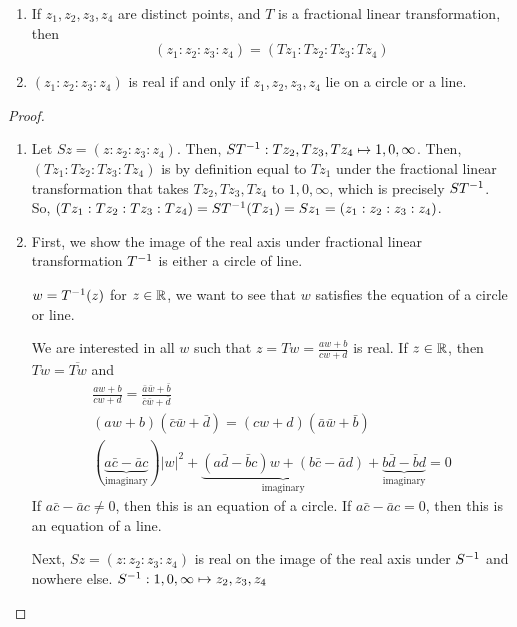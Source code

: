 \documentclass[a4paper,12pt]{article}
\begin{document}
\begin{theorem}
    \begin{enumerate}
        \item If $z_1,z_2,z_3,z_4$ are distinct points, and $T$ is a fractional linear transformation, then\begin{equation}
            (z_1:z_2:z_3:z_4)=(Tz_1:Tz_2:Tz_3:Tz_4)
        \end{equation}
        \item $(z_1:z_2:z_3:z_4)$ is real if and only if $z_1,z_2,z_3,z_4$ lie on a circle or a line.
    \end{enumerate}
    \begin{proof}
        \begin{enumerate}
            \item Let $Sz=(z:z_2:z_3:z_4)$. Then, $ST^{-1}:Tz_2,Tz_3,Tz_4\mapsto1,0,\infty$. Then, $(Tz_1:Tz_2:Tz_3:Tz_4)$ is by definition equal to $Tz_1$ under the fractional linear transformation that takes $Tz_2,Tz_3,Tz_4$ to $1,0,\infty$, which is precisely $ST^{-1}$. So, $(Tz_1:Tz_2:Tz_3:Tz_4)=ST^{-1}(Tz_1)=Sz_1=(z_1:z_2:z_3:z_4)$.
            \item First, we show the image of the real axis under fractional linear transformation $T^{-1}$ is either a circle of line.
            
            $w=T^{-1}(z)$ for $z\in\mathbb{R}$, we want to see that $w$ satisfies the equation of a circle or line. 
            
            We are interested in all $w$ such that $z=Tw=\frac{aw+b}{cw+d}$ is real. If $z\in\mathbb{R}$, then $Tw=\overline{Tw}$ and \begin{align}
                \frac{aw+b}{cw+d}=\frac{\bar a\bar w+\bar b}{\bar c\bar w+\bar d}\\
                (aw+b)(\bar c\bar w+\bar d)=(cw+d)(\bar a\bar w+\bar b)\\
                (\underbrace{a\bar c-\bar ac}_\text{imaginary})|w|^2+\underbrace{(a\bar d-\bar bc)w+(b\bar c-\bar ad)}_\text{imaginary}+\underbrace{b\bar d-\bar bd}_\text{imaginary}=0
            \end{align}
            If $a\bar c-\bar ac\neq 0$, then this is an equation of a circle. If $a\bar c-\bar ac=0$, then this is an equation of a line.

            Next, $Sz=(z:z_2:z_3:z_4)$ is real on the image of the real axis under $S^{-1}$ and nowhere else. $S^{-1}:1,0,\infty\mapsto z_2,z_3,z_4$
        \end{enumerate}
    \end{proof}
\end{theorem}
\end{document}
